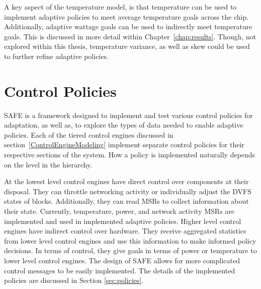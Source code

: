     A key aspect of the temperature model, is that temperature can be used to implement adaptive policies to meet average temperature goals across the chip. Additionally, adaptive wattage goals can be used to indirectly meet temperature goals. This is discussed in more detail within Chapter~\ref{chap:results}. Though, not explored within this thesis, temperature variance, as well as skew could be used to further refine adaptive policies. 


\section{Control Policies}
    SAFE is a framework designed to implement and test various control policies for adaptation, as well as, to explore the types of data needed to enable adaptive policies. Each of the tiered control engines discussed in section~\ref{ControlEngineModeling} implement separate control policies for their respective sections of the system. How a policy is implemented naturally depends on the level in the hierarchy.

    At the lowest level control engines have direct control over components at their disposal. They can throttle networking activity or individually adjust the DVFS states of blocks. Additionally, they can read MSRs to collect information about their state. Currently, temperature, power, and network activity MSRs are implemented and used in implemented adaptive policies. Higher level control engines have indirect control over hardware. They receive aggregated statistics from lower level control engines and use this information to make informed policy decisions. In terms of control, they give goals in terms of power or temperature to lower level control engines. The design of SAFE allows for more complicated control messages to be easily implemented. The details of the implemented policies are discussed in Section \ref{sec:policies}.








